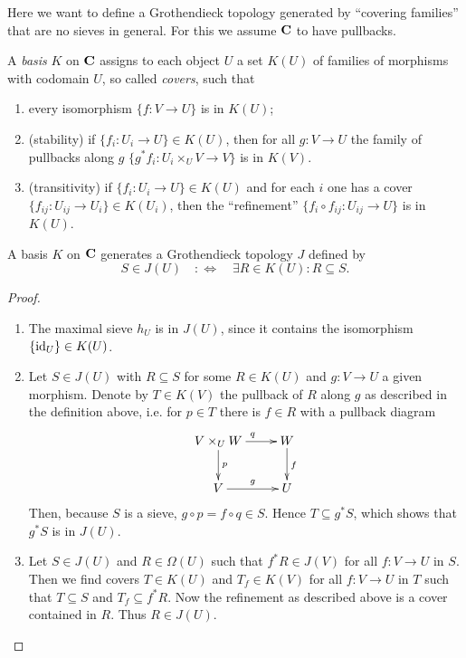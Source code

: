 \documentclass{notes}
\begin{document}
{Here we want to define a Grothendieck topology generated by ``covering families'' that are no sieves in general. For this we assume $\mathbf{C}$ to have pullbacks.

\begin{definition}
	A \emph{basis} $K$ on $\mathbf{C}$ assigns to each object $U$ a set $K(U)$ of families of morphisms with codomain $U$, so called \emph{covers}, such that
	\begin{enumerate}
		\item every isomorphism $\{f : V \rightarrow U\}$ is in $K(U)$;
		\item (stability) if $\{f_i : U_i \rightarrow U\} \in K(U)$, then for all $g : V \rightarrow U$ the family of pullbacks along $g$ $\{g^*f_i : U_i \times_U V \rightarrow V\}$
		is in $K(V)$.
		\item (transitivity) if $\{f_i : U_i \rightarrow U\} \in K(U)$ and for each $i$ one has a cover $\{f_{ij} : U_{ij} \rightarrow U_i\} \in K(U_i)$, then the ``refinement'' $\{f_i \circ f_{ij} : U_{ij} \rightarrow U\}$ is in $K(U)$.
	\end{enumerate}
\end{definition}

\begin{prop}
	A basis $K$ on $\mathbf{C}$ generates a Grothendieck topology $J$ defined by
	\begin{equation*}
		S \in J(U) \quad : \Longleftrightarrow \quad \exists R \in K(U) : R \subseteq S.
	\end{equation*}
\end{prop}

\begin{proof}
	\begin{enumerate}
		\item The maximal sieve $h_U$ is in $J(U)$, since it contains the isomorphism $\{\textup{id}_U\} \in K(U)$.
		\item Let $S \in J(U)$ with $R \subseteq S$ for some $R \in K(U)$ and $g : V \rightarrow U$ a given morphism.
		Denote by $T \in K(V)$ the pullback of $R$ along $g$ as described in the definition above,
		i.e. for $p \in T$ there is $f \in R$ with a pullback diagram
		$$
		\xymatrix{
		V \times_U W \ar[d]^p \ar[r]^q & W \ar[d]^f \\
		V \ar[r]^g & U
		}
		$$
		Then, because $S$ is a sieve, $g \circ p = f \circ q \in S$.
		Hence $T \subseteq g^*S$, which shows that $g^*S$ is in $J(U)$.
		\item Let $S \in J(U)$ and $R \in \Omega(U)$ such that $f^*R \in J(V)$ for all $f : V \rightarrow U$ in $S$.
		Then we find covers $T \in K(U)$ and $T_f \in K(V)$ for all $f : V \rightarrow U$ in $T$ such that $T \subseteq S$ and $T_f \subseteq f^*R$.
		Now the refinement as described above is a cover contained in $R$.
		Thus $R \in J(U)$.
	\end{enumerate}
\end{proof}

}
\end{document}
